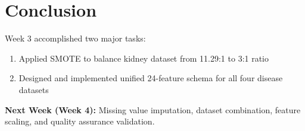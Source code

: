 \documentclass[11pt,a4paper]{article}
\begin{document}
\section{Conclusion}

Week 3 accomplished two major tasks:
\begin{enumerate}
    \item Applied SMOTE to balance kidney dataset from 11.29:1 to 3:1 ratio
    \item Designed and implemented unified 24-feature schema for all four disease datasets
\end{enumerate}

\textbf{Next Week (Week 4):} Missing value imputation, dataset combination, feature scaling, and quality assurance validation.
\end{document}
